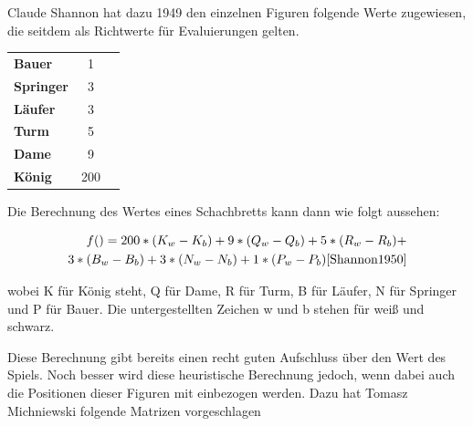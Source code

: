 Claude Shannon hat dazu 1949 den einzelnen Figuren folgende Werte zugewiesen, die seitdem als Richtwerte für Evaluierungen gelten. \cite{Shannon1950}

\begin{tabular}{ l c r }
\textbf{Bauer} & 1\\
\textbf{Springer} & 3 \\
\textbf{Läufer} & 3 \\
\textbf{Turm} & 5 \\
\textbf{Dame} & 9 \\
\textbf{König} & 200
\end{tabular}


Die Berechnung des Wertes eines Schachbretts kann dann wie folgt aussehen:

\begin{equation}
\begin{aligned}
f() = 200*(K_w-K_b) + 9*(Q_w-Q_b) + 5*(R_w-R_b) + \\3*(B_w-B_b) + 3*(N_w-N_b) + 1*(P_w-P_b) \cite{Shannon1950}
\end{aligned}
\end{equation}


wobei K für König steht, Q für Dame, R für Turm, B für Läufer, N für Springer und P für Bauer. Die untergestellten Zeichen w und b stehen für weiß und schwarz.

Diese Berechnung gibt bereits einen recht guten Aufschluss über den Wert des Spiels. Noch besser wird diese heuristische Berechnung jedoch, wenn dabei auch die Positionen dieser Figuren mit einbezogen werden. Dazu hat Tomasz Michniewski folgende Matrizen vorgeschlagen \cite{O.V.2019a}

